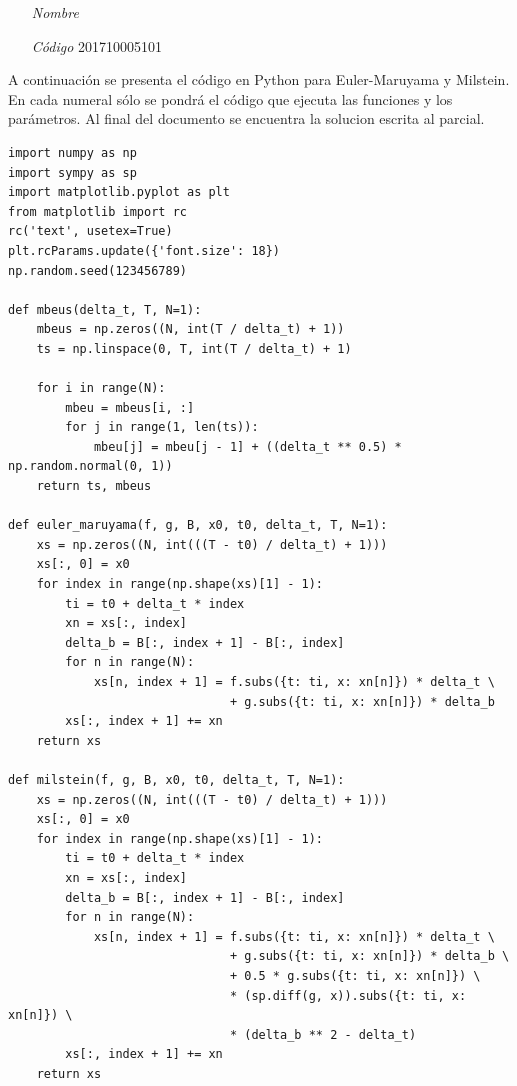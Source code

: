 \documentclass[fleqn]{article}
\begin{document}
 \vspace{0.3cm}
   \begin{itemize}[leftmargin=6.25cm, labelsep=0.5cm]

     \item[\textit{Nombre}]  %
     \item[\textit{Código}] 201710005101 %

   \end{itemize}
\vspace{0.3cm}
A continuación se presenta el código en Python para Euler-Maruyama y Milstein. En cada numeral sólo se pondrá el código que ejecuta las funciones y los parámetros. Al final del documento se encuentra la solucion escrita al parcial.
\begin{verbatim}
import numpy as np
import sympy as sp
import matplotlib.pyplot as plt
from matplotlib import rc
rc('text', usetex=True)
plt.rcParams.update({'font.size': 18})
np.random.seed(123456789)

def mbeus(delta_t, T, N=1):
    mbeus = np.zeros((N, int(T / delta_t) + 1))
    ts = np.linspace(0, T, int(T / delta_t) + 1)

    for i in range(N):
        mbeu = mbeus[i, :]
        for j in range(1, len(ts)):
            mbeu[j] = mbeu[j - 1] + ((delta_t ** 0.5) * np.random.normal(0, 1))
    return ts, mbeus

def euler_maruyama(f, g, B, x0, t0, delta_t, T, N=1):
    xs = np.zeros((N, int(((T - t0) / delta_t) + 1)))
    xs[:, 0] = x0
    for index in range(np.shape(xs)[1] - 1):
        ti = t0 + delta_t * index
        xn = xs[:, index]
        delta_b = B[:, index + 1] - B[:, index]
        for n in range(N):
            xs[n, index + 1] = f.subs({t: ti, x: xn[n]}) * delta_t \
                               + g.subs({t: ti, x: xn[n]}) * delta_b
        xs[:, index + 1] += xn
    return xs

def milstein(f, g, B, x0, t0, delta_t, T, N=1):
    xs = np.zeros((N, int(((T - t0) / delta_t) + 1)))
    xs[:, 0] = x0
    for index in range(np.shape(xs)[1] - 1):
        ti = t0 + delta_t * index
        xn = xs[:, index]
        delta_b = B[:, index + 1] - B[:, index]
        for n in range(N):
            xs[n, index + 1] = f.subs({t: ti, x: xn[n]}) * delta_t \
                               + g.subs({t: ti, x: xn[n]}) * delta_b \
                               + 0.5 * g.subs({t: ti, x: xn[n]}) \
                               * (sp.diff(g, x)).subs({t: ti, x: xn[n]}) \
                               * (delta_b ** 2 - delta_t)
        xs[:, index + 1] += xn
    return xs
\end{verbatim}
\end{document}
